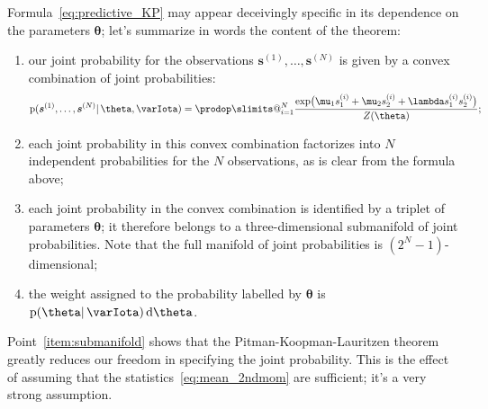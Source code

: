 \documentclass[\ifafour a4paper,12pt,\else a5paper,10pt,\fi%
onecolumn,oneside,article,%
british%
]{memoir}
\makeatletter
\theoremstyle{remark}
\theoremstyle{innote}
\def\prod{\DOTSI\prodop\slimits@}
\newcommand*{\di}{\mathrm{d}}%
\newcommand*{\pf}{\mathrm{p}}%
\renewcommand*{\|}{\mathpunct{|}}
\newcommand*{\yI}{\varIota}
\newcommand*{\ys}{\bm{s}}
\newcommand*{\yso}[1]{\ys^{(#1)}}
\newcommand*{\ysso}[1]{s^{(#1)}}
\newcommand*{\la}{\lambda}
\newcommand*{\yth}{\bm{\theta}}
\makeatother
\begin{document}
Formula~\eqref{eq:predictive_KP} may appear deceivingly specific in its
dependence on the parameters $\yth$; let's summarize in words the content
of the theorem:
\begin{enumerate}[label=(\textit{\alph*})]
\item our joint probability for the observations $\yso{1}, \dotsc,\yso{N}$
  is given by a convex combination of joint probabilities:
  \begin{equation}
    \label{eq:component_combination}
  \pf(\yso{1}, \dotsc, \yso{N} \|\yth, \yI )
  =
  \prod_{i=1}^{N}
  \frac{  \exp\bigl(
    \mu_1 \ysso{i}_1 + \mu_2 \ysso{i}_2 + \la \ysso{i}_1 \ysso{i}_2
    \bigr) }{Z(\yth)};
  \end{equation}

\item each joint probability in this convex combination factorizes into $N$
  independent probabilities for the $N$ observations, as is clear from the
  formula above;
\item\label{item:submanifold}each joint probability in the convex
  combination is identified by a triplet of parameters $\yth$; it therefore
  belongs to a three-dimensional submanifold of joint probabilities. Note
  that the full manifold of joint probabilities is $(2^N-1)$-dimensional;
\item\label{item:weights}the weight assigned to the probability labelled by
  $\yth$ is $\pf(\yth \|\yI)\,\di\yth$.
\end{enumerate}

\medskip

Point~\ref{item:submanifold} shows that the Pitman-Koopman-Lauritzen
theorem greatly reduces our freedom in specifying the joint probability.
This is the effect of assuming that the statistics~\eqref{eq:mean_2ndmom}
are sufficient; it's a very strong assumption.
\end{document}
